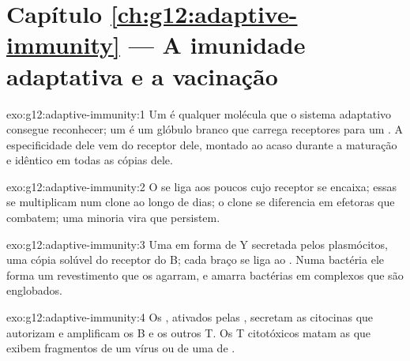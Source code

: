 \section*{Capítulo \ref{ch:g12:adaptive-immunity} --- A imunidade adaptativa e a vacinação}

\begin{solution}{exo:g12:adaptive-immunity:1}
Um  é qualquer molécula que o sistema adaptativo consegue
reconhecer; um  é um glóbulo branco que carrega receptores
para um . A especificidade dele vem do receptor dele, montado
ao acaso durante a maturação e idêntico em todas as cópias dele.
\end{solution}

\begin{solution}{exo:g12:adaptive-immunity:2}
O  se liga aos poucos  cujo receptor se encaixa;
essas  se multiplicam num clone ao longo de dias; o clone se
diferencia em  efetoras que combatem; uma minoria vira  que persistem.
\end{solution}

\begin{solution}{exo:g12:adaptive-immunity:3}
Uma  em forma de Y secretada pelos plasmócitos, uma cópia
solúvel do receptor do  B; cada braço se liga ao .
Numa bactéria ele forma um revestimento que os  agarram, e
amarra bactérias em complexos que são englobados.
\end{solution}

\begin{solution}{exo:g12:adaptive-immunity:4}
Os , ativados pelas ,
secretam as citocinas que autorizam e amplificam os  B e os
outros  T. Os  T citotóxicos matam as  que
exibem fragmentos de um vírus ou de uma  de .
\end{solution}

